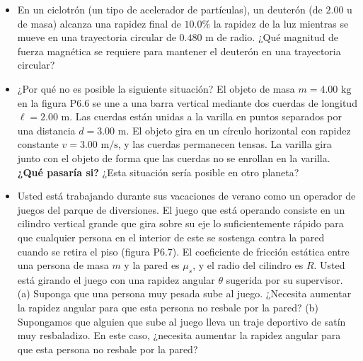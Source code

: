 \documentclass[11pt,a4paper]{article}
\begin{document}
\begin{itemize}
    \item[\textbf{5.}] En un ciclotrón (un tipo de acelerador de partículas), un deuterón (de $2.00 \text{ u}$ de masa) alcanza una rapidez final de $10.0\%$ la rapidez de la luz mientras se mueve en una trayectoria circular de $0.480 \text{ m}$ de radio. ¿Qué magnitud de fuerza magnética se requiere para mantener el deuterón en una trayectoria circular?
    \vspace*{6cm}

    \item[\textbf{6.}] ¿Por qué no es posible la siguiente situación? El objeto de masa $m = 4.00 \text{ kg}$ en la figura P6.6 se une a una barra vertical mediante dos cuerdas de longitud $\ell = 2.00 \text{ m}$. Las cuerdas están unidas a la varilla en puntos separados por una distancia $d = 3.00 \text{ m}$. El objeto gira en un círculo horizontal con rapidez constante $v = 3.00 \text{ m/s}$, y las cuerdas permanecen tensas. La varilla gira junto con el objeto de forma que las cuerdas no se enrollan en la varilla. \textbf{¿Qué pasaría si?} ¿Esta situación sería posible en otro planeta?
    \vspace*{7cm}

    \item[\textbf{7.}] Usted está trabajando durante sus vacaciones de verano como un operador de juegos del parque de diversiones. El juego que está operando consiste en un cilindro vertical grande que gira sobre su eje lo suficientemente rápido para que cualquier persona en el interior de este se sostenga contra la pared cuando se retira el piso (figura P6.7). El coeficiente de fricción estática entre una persona de masa $m$ y la pared es $\mu_s$, y el radio del cilindro es $R$. Usted está girando el juego con una rapidez angular $\theta$ sugerida por su supervisor. (a) Suponga que una persona muy pesada sube al juego. ¿Necesita aumentar la rapidez angular para que esta persona no resbale por la pared? (b) Supongamos que alguien que sube al juego lleva un traje deportivo de satín muy resbaladizo. En este caso, ¿necesita aumentar la rapidez angular para que esta persona no resbale por la pared?
    \vspace*{7cm}


\end{itemize}
\end{document}
